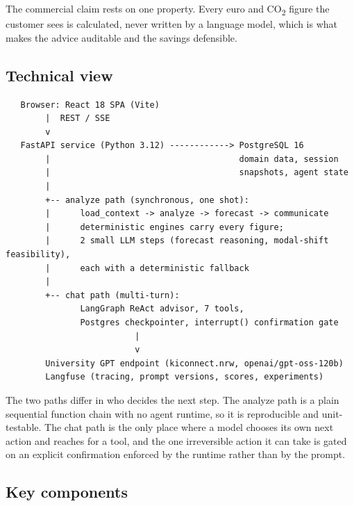 \documentclass[
  11pt,
  a4paper,
  DIV=11,
  numbers=noendperiod,
  notitlepage]{scrreprt}
\begin{document}
The commercial claim rests on one property. Every euro and
CO\textsubscript{2} figure the customer sees is calculated, never
written by a language model, which is what makes the advice auditable
and the savings defensible.

\subsection{Technical view}\label{technical-view}

\begin{verbatim}
   Browser: React 18 SPA (Vite)
        |  REST / SSE
        v
   FastAPI service (Python 3.12) ------------> PostgreSQL 16
        |                                      domain data, session
        |                                      snapshots, agent state
        |
        +-- analyze path (synchronous, one shot):
        |      load_context -> analyze -> forecast -> communicate
        |      deterministic engines carry every figure;
        |      2 small LLM steps (forecast reasoning, modal-shift feasibility),
        |      each with a deterministic fallback
        |
        +-- chat path (multi-turn):
               LangGraph ReAct advisor, 7 tools,
               Postgres checkpointer, interrupt() confirmation gate
                          |
                          v
        University GPT endpoint (kiconnect.nrw, openai/gpt-oss-120b)
        Langfuse (tracing, prompt versions, scores, experiments)
\end{verbatim}

The two paths differ in who decides the next step. The analyze path is a
plain sequential function chain with no agent runtime, so it is
reproducible and unit-testable. The chat path is the only place where a
model chooses its own next action and reaches for a tool, and the one
irreversible action it can take is gated on an explicit confirmation
enforced by the runtime rather than by the prompt.

\subsection{Key components}\label{key-components}
\end{document}
